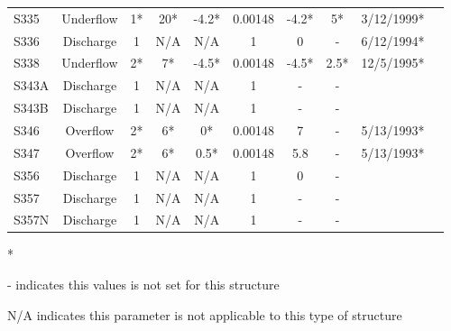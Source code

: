 \begin{table}[h]
\begin{tabular}{@{}lccccccccc@{}}
{S335}          & Underflow     & 1*       & 20*         & -4.2*        & 0.00148     & -4.2*           & 5*      & 3/12/1999*  \\
{S336}          & Discharge     & 1        & N/A         & N/A          & 1           &  0              & -       & 6/12/1994*  \\
{S338}          & Underflow     & 2*       & 7*          & -4.5*        & 0.00148     &  -4.5*          & 2.5*    & 12/5/1995*  \\
{S343A}         & Discharge     & 1        & N/A         & N/A          & 1           &  -              & -       &             \\
{S343B}         & Discharge     & 1        & N/A         & N/A          & 1           &  -              & -       &             \\
{S346}          & Overflow      & 2*       & 6*          & 0*           & 0.00148     &  7              & -       & 5/13/1993*  \\
{S347}          & Overflow      & 2*       & 6*          & 0.5*         & 0.00148     &  5.8            & -       & 5/13/1993*  \\
{S356}          & Discharge     & 1        & N/A         & N/A          & 1           &  0              & -       &             \\
{S357}          & Discharge     & 1        & N/A         & N/A          & 1           &  -              & -       &             \\
{S357N}         & Discharge     & 1        & N/A         & N/A          & 1           &  -              & -       &             \\
\hline
\end{tabular}

* \cite{corp2005}

- indicates this values is not set for this structure

N/A indicates this parameter is not applicable to this type of structure
\end{table}
\normalsize

